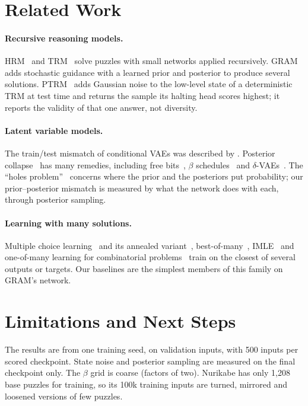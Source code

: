 \documentclass{article}
\begin{document}
\section{Related Work}

\paragraph{Recursive reasoning models.} HRM~\cite{wang2025hrm} and TRM~\cite{jolicoeur2025trm} solve puzzles with
small networks applied recursively. GRAM~\cite{baek2026gram} adds stochastic guidance with a learned prior and
posterior to produce several solutions. PTRM~\cite{sghaier2026ptrm} adds Gaussian noise to the low-level state of a
deterministic TRM at test time and returns the sample its halting head scores highest; it reports the validity of that
one answer, not diversity.

\paragraph{Latent variable models.} The train/test mismatch of conditional VAEs was described by
\citet{sohn2015cvae}. Posterior collapse~\cite{bowman2016generating} has many remedies, including free
bits~\cite{kingma2016iaf}, $\beta$ schedules~\cite{higgins2017betavae} and $\delta$-VAEs~\cite{razavi2019delta}. The
``holes problem''~\cite{rezende2018taming} concerns where the prior and the posteriors put probability; our
prior--posterior mismatch is measured by what the network does with each, through posterior sampling.

\paragraph{Learning with many solutions.} Multiple choice learning~\cite{guzmanrivera2012mcl} and its annealed
variant~\cite{perera2024amcl}, best-of-many~\cite{bhattacharyya2018bestofmany}, IMLE~\cite{li2018imle} and
one-of-many learning for combinatorial problems~\cite{nandwani2021oneofmany} train on the closest of several outputs
or targets. Our baselines are the simplest members of this family on GRAM's network.

\section{Limitations and Next Steps}
\label{sec:limits}

The results are from one training seed, on validation inputs, with 500 inputs per scored checkpoint. State noise and
posterior sampling are measured on the final checkpoint only. The $\beta$ grid is coarse (factors of two). Nurikabe
has only 1{,}208 base puzzles for training, so its 100k training inputs are turned, mirrored and loosened versions of
few puzzles.
\end{document}
